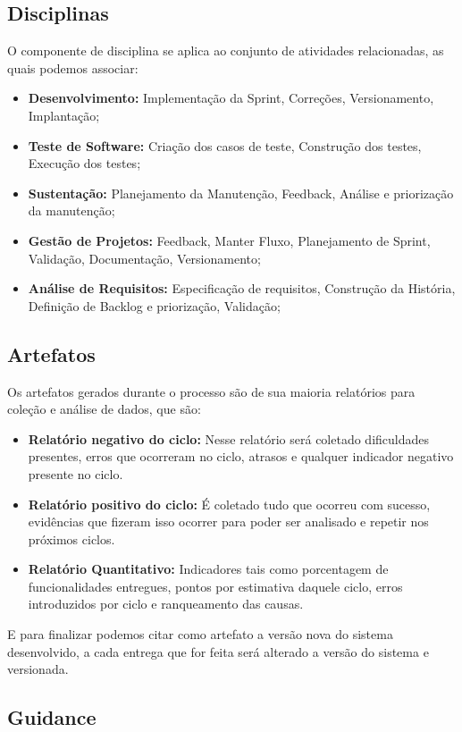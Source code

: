\documentclass[	DIV=calc,%
							paper=a4,%
							fontsize=12pt,%
							onecolumn]{scrartcl}	 					%
\begin{document}
\subsection{Disciplinas}
O componente de disciplina se aplica ao conjunto de atividades relacionadas, as quais podemos associar:
\begin{itemize}
		\item \textbf{Desenvolvimento:} Implementação da Sprint, Correções, Versionamento, Implantação; 
		\item \textbf{Teste de Software:} Criação dos casos de teste, Construção dos testes, Execução dos testes; 
		\item \textbf{Sustentação:}  Planejamento da Manutenção, Feedback, Análise e priorização da manutenção; 
		\item \textbf{Gestão de Projetos:}  Feedback, Manter Fluxo, Planejamento de Sprint, Validação, Documentação, Versionamento; 
		\item \textbf{Análise de Requisitos:} Especificação de requisitos, Construção da História, Definição de Backlog e priorização, Validação; 
\end{itemize}	


\subsection{Artefatos}
Os artefatos gerados durante o processo são de sua maioria relatórios para coleção e análise de dados, que são:
\begin{itemize}
	\item \textbf{Relatório negativo do ciclo:} Nesse relatório será coletado dificuldades presentes, erros que ocorreram no ciclo, atrasos e qualquer indicador negativo presente no ciclo.
	\item \textbf{Relatório positivo do ciclo:} É coletado tudo que ocorreu com sucesso, evidências que fizeram isso ocorrer para poder ser analisado e repetir nos próximos ciclos. 
	\item \textbf{Relatório Quantitativo:} Indicadores tais como porcentagem de funcionalidades entregues, pontos por estimativa daquele ciclo, erros introduzidos por ciclo e ranqueamento das causas.
\end{itemize}

E para finalizar podemos citar como artefato a versão nova do sistema desenvolvido, a cada entrega que for feita será alterado a versão do sistema e versionada.
\subsection{Guidance}
\end{document}
